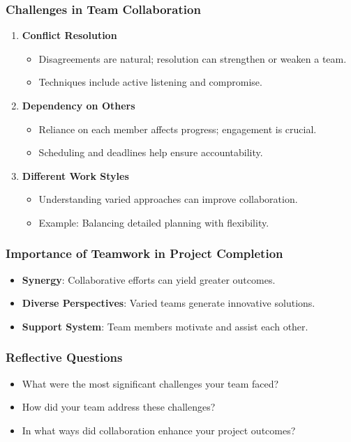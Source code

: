 \documentclass{beamer}
\begin{document}
\begin{frame}[fragile]
    \frametitle{Challenges in Team Collaboration}
    \begin{enumerate}
        \item \textbf{Conflict Resolution}
        \begin{itemize}
            \item Disagreements are natural; resolution can strengthen or weaken a team.
            \item Techniques include active listening and compromise.
        \end{itemize}

        \item \textbf{Dependency on Others}
        \begin{itemize}
            \item Reliance on each member affects progress; engagement is crucial.
            \item Scheduling and deadlines help ensure accountability.
        \end{itemize}
        
        \item \textbf{Different Work Styles}
        \begin{itemize}
            \item Understanding varied approaches can improve collaboration.
            \item Example: Balancing detailed planning with flexibility.
        \end{itemize}
    \end{enumerate}
\end{frame}

\begin{frame}[fragile]
    \frametitle{Importance of Teamwork in Project Completion}
    \begin{itemize}
        \item \textbf{Synergy}: Collaborative efforts can yield greater outcomes.
        \item \textbf{Diverse Perspectives}: Varied teams generate innovative solutions.
        \item \textbf{Support System}: Team members motivate and assist each other.
    \end{itemize}
\end{frame}

\begin{frame}[fragile]
    \frametitle{Reflective Questions}
    \begin{itemize}
        \item What were the most significant challenges your team faced?
        \item How did your team address these challenges?
        \item In what ways did collaboration enhance your project outcomes?
    \end{itemize}
\end{frame}
\end{document}
